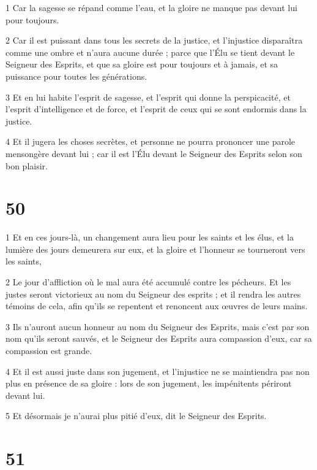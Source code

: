 \par 1 Car la sagesse se répand comme l'eau, et la gloire ne manque pas devant lui pour toujours.
\par 2 Car il est puissant dans tous les secrets de la justice, et l'injustice disparaîtra comme une ombre et n'aura aucune durée ; parce que l'Élu se tient devant le Seigneur des Esprits, et que sa gloire est pour toujours et à jamais, et sa puissance pour toutes les générations.
\par 3 Et en lui habite l'esprit de sagesse, et l'esprit qui donne la perspicacité, et l'esprit d'intelligence et de force, et l'esprit de ceux qui se sont endormis dans la justice.
\par 4 Et il jugera les choses secrètes, et personne ne pourra prononcer une parole mensongère devant lui ; car il est l'Élu devant le Seigneur des Esprits selon son bon plaisir.

\chapter{50}

\par 1 Et en ces jours-là, un changement aura lieu pour les saints et les élus, et la lumière des jours demeurera sur eux, et la gloire et l'honneur se tourneront vers les saints,
\par 2 Le jour d'affliction où le mal aura été accumulé contre les pécheurs. Et les justes seront victorieux au nom du Seigneur des esprits ; et il rendra les autres témoins de cela, afin qu'ils se repentent et renoncent aux œuvres de leurs mains.
\par 3 Ils n'auront aucun honneur au nom du Seigneur des Esprits, mais c'est par son nom qu'ils seront sauvés, et le Seigneur des Esprits aura compassion d'eux, car sa compassion est grande.
\par 4 Et il est aussi juste dans son jugement, et l'injustice ne se maintiendra pas non plus en présence de sa gloire : lors de son jugement, les impénitents périront devant lui.
\par 5 Et désormais je n'aurai plus pitié d'eux, dit le Seigneur des Esprits.

\chapter{51}

